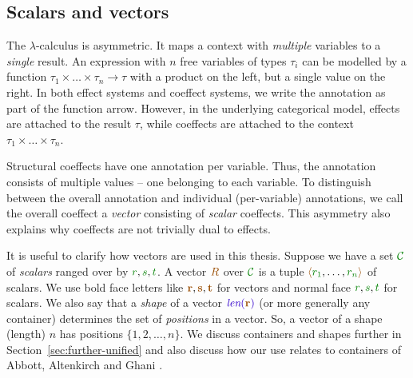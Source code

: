 
\subsection{Scalars and vectors}
\label{sec:applications-strucutre-vec}

The $\lambda$-calculus is asymmetric. It maps a context with \emph{multiple} variables to a
\emph{single} result. An expression with $n$ free variables of types $\tau_i$ can be modelled by a function
$\tau_1 \times \ldots \times \tau_n \rightarrow \tau$ with a product on the left, but a single value
on the right. In both effect systems and coeffect systems, we write the annotation as part of
the function arrow. However, in the underlying categorical model, effects are attached to the result
$\tau$, while coeffects are attached to the context $\tau_1 \times \ldots \times \tau_n$.

Structural coeffects have one annotation per variable. Thus, the annotation consists
of multiple values -- one belonging to each variable. To distinguish between the overall annotation
and individual (per-variable) annotations, we call the overall coeffect a \emph{vector} consisting of
\emph{scalar} coeffects. This asymmetry also explains why coeffects are not trivially dual to
effects.

It is useful to clarify how vectors are used in this thesis. Suppose we have a set $\C$ of
\emph{scalars} ranged over by $\cclrd{r},\cclrd{s},\cclrd{t}$. A vector $\aclrd{R}$
over $\C$ is a tuple $\alift{ \cclrd{r_1}, \ldots, \cclrd{r_n} }$ of scalars.
We use bold face letters like $\aclrd{\textbf{r}}, \aclrd{\textbf{s}}, \aclrd{\textbf{t}}$ for
vectors and normal face $\cclrd{r},\cclrd{s},\cclrd{t}$ for scalars. We also say that a
\emph{shape} of a vector $\slen{\aclrd{\textbf{r}}}$ (or more generally any container)
determines the set of \emph{positions} in a vector. So, a vector of a shape (length) $n$ has positions
$\{ 1, 2, \ldots, n \}$. We discuss containers and shapes further in Section~\ref{sec:further-unified} and also
discuss how our use relates to containers of Abbott, Altenkirch and Ghani \cite{types-containers}.

